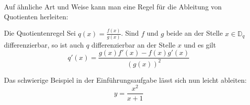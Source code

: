 Auf ähnliche Art und Weise kann man eine Regel für die Ableitung von Quotienten herleiten:

\begin{satz}
	{Die Quotientenregel}{}
	Sei $q(x)=\frac{f(x)}{g(x)}$. Sind $f$ und $g$ beide an der Stelle $x \in \mathbb{D}_q$ differenzierbar, so ist auch $q$ differenzierbar an der Stelle $x$ und es gilt
	$$q'(x)=\frac{g(x)f'(x)-f(x)g'(x)}{(g(x))^2}$$
\end{satz}

\begin{bsp}
	{}{}
	Das schwierige Beispiel in der Einführungsaufgabe lässt sich nun leicht ableiten:
	$$y=\frac{x^2}{x+1} $$ %

	\vspace*{8cm}
\end{bsp}

